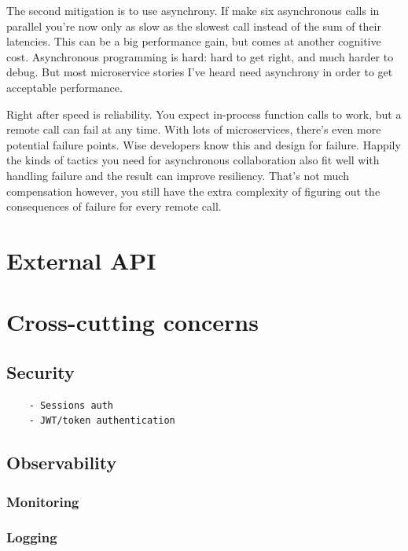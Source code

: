 \documentclass[thesis=M,english,hidelinks]{FITthesis}[2012/10/20]
\begin{document}
The second mitigation is to use asynchrony. If make six asynchronous calls in parallel you're now only as slow as the slowest call instead of the sum of their latencies. This can be a big performance gain, but comes at another cognitive cost. Asynchronous programming is hard: hard to get right, and much harder to debug. But most microservice stories I've heard need asynchrony in order to get acceptable performance.

Right after speed is reliability. You expect in-process function calls to work, but a remote call can fail at any time. With lots of microservices, there's even more potential failure points. Wise developers know this and design for failure. Happily the kinds of tactics you need for asynchronous collaboration also fit well with handling failure and the result can improve resiliency. That's not much compensation however, you still have the extra complexity of figuring out the consequences of failure for every remote call.



% 
% 
\section{External API}
\label{sec:ext_api}


% 
%
\section{Cross-cutting concerns}
\subsection{Security}
\begin{verbatim}
    - Sessions auth
    - JWT/token authentication
\end{verbatim}


\subsection{Observability}
\subsubsection{Monitoring}
\subsubsection{Logging}
\end{document}
